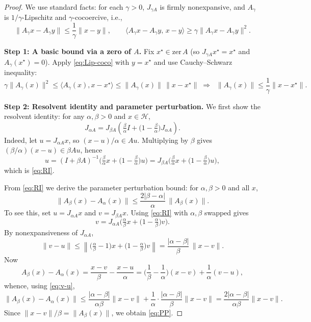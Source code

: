 \documentclass[10pt,a4paper]{amsart}
\begin{document}
\begin{proof}
We use standard facts: for each $\gamma>0$, $J_{\gamma A}$ is firmly nonexpansive, and $A_\gamma$ is $1/\gamma$-Lipschitz and $\gamma$-cocoercive, i.e.,
\begin{equation}\label{eq:Lip-coco}
\|A_\gamma x-A_\gamma y\|\le \frac{1}{\gamma}\|x-y\|, \qquad
\langle A_\gamma x-A_\gamma y,\,x-y\rangle \ge \gamma\|A_\gamma x-A_\gamma y\|^2 .
\end{equation}

\textbf{Step 1: A basic bound via a zero of $A$.}
Fix $x^{\star}\in\mathrm{zer}\,A$ (so $J_{\gamma A}x^{\star}=x^{\star}$ and $A_\gamma(x^{\star})=0$). Apply \eqref{eq:Lip-coco} with $y=x^{\star}$ and use Cauchy--Schwarz inequality:
\begin{equation}
\gamma\|A_\gamma(x)\|^2 \le \langle A_\gamma(x),x-x^{\star}\rangle
\le \|A_\gamma(x)\|\,\|x-x^{\star}\| \;\Rightarrow\;
{\;\|A_\gamma(x)\|\le \frac{1}{\gamma}\|x-x^{\star}\|.\;}
\label{eq:basic-bound}
\end{equation}

\textbf{Step 2: Resolvent identity and parameter perturbation.}
We first show the resolvent identity: for any $\alpha,\beta>0$ and $x\in\mathcal H$,
\begin{equation}\label{eq:RI}
{\quad
J_{\alpha A}
= J_{\beta A}\!\left(\tfrac{\beta}{\alpha}I+\Big(1-\tfrac{\beta}{\alpha}\Big)J_{\alpha A}\right).
\quad}
\end{equation}
Indeed, let $u=J_{\alpha A}x$, so $(x-u)/\alpha\in Au$. Multiplying by $\beta$ gives
$(\beta/\alpha)(x-u)\in \beta Au$, hence
\[
u=(I+\beta A)^{-1}\!\Big(\tfrac{\beta}{\alpha}x+\Big(1-\tfrac{\beta}{\alpha}\Big)u\Big)
=J_{\beta A}\!\Big(\tfrac{\beta}{\alpha}x+\Big(1-\tfrac{\beta}{\alpha}\Big)u\Big),
\]
which is \eqref{eq:RI}.

From \eqref{eq:RI} we derive the parameter perturbation bound: for $\alpha,\beta>0$ and all $x$,
\begin{equation}\label{eq:PP}
{\quad
\|A_\beta(x)-A_\alpha(x)\|
\le \frac{2|\beta-\alpha|}{\alpha}\,\|A_\beta(x)\| .
\quad}
\end{equation}
To see this, set $u=J_{\alpha A}x$ and $v=J_{\beta A}x$. Using \eqref{eq:RI} with $\alpha,\beta$ swapped gives
\[
v=J_{\alpha A}\!\Big(\tfrac{\alpha}{\beta}x+\Big(1-\tfrac{\alpha}{\beta}\Big)v\Big).
\]
By nonexpansiveness of $J_{\alpha A}$,
\begin{equation}\label{eq:v-u}
\|v-u\|
\le \left\|\Big(\tfrac{\alpha}{\beta}-1\Big)x+\Big(1-\tfrac{\alpha}{\beta}\Big)v\right\|
= \frac{|\alpha-\beta|}{\beta}\,\|x-v\|.
\end{equation}
Now
\[
A_\beta(x)-A_\alpha(x)
= \frac{x-v}{\beta}-\frac{x-u}{\alpha}
= \Big(\frac{1}{\beta}-\frac{1}{\alpha}\Big)(x-v) + \frac{1}{\alpha}(v-u),
\]
whence, using \eqref{eq:v-u},
\[
\|A_\beta(x)-A_\alpha(x)\|
\le \frac{|\alpha-\beta|}{\alpha\beta}\|x-v\|
+ \frac{1}{\alpha}\cdot \frac{|\alpha-\beta|}{\beta}\|x-v\|
= \frac{2|\alpha-\beta|}{\alpha\beta}\|x-v\|.
\]
Since $\|x-v\|/\beta=\|A_\beta(x)\|$, we obtain \eqref{eq:PP}.


\end{proof}
\end{document}
